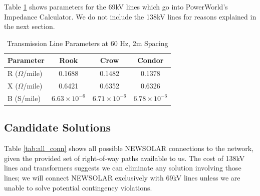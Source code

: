 \documentclass[conference]{IEEEtran}
\begin{document}
Table \ref{tab:tl_params} shows parameters for the 69kV lines which go into PowerWorld's Impedance Calculator. We do not include the 138kV lines for reasons explained in the next section.
\begin{table}
	\begin{tabular}{|l|c|c|c|}
		\hline
		Parameter & Rook & Crow & Condor \\
		\hline
		R ($\Omega$/mile) & 0.1688 & 0.1482 & 0.1378 \\
		X ($\Omega$/mile) & 0.6421 & 0.6352 & 0.6326 \\
		B (S/mile) & $6.63\times10^{-6}$ & $6.71\times10^{-6}$ & $6.78\times10^{-6}$ \\
		\hline
	\end{tabular}
	\vspace{0.5em}
	\caption{Transmission Line Parameters at 60 Hz, 2m Spacing}
	\label{tab:tl_params}
\end{table}
\subsection{Candidate Solutions}
Table \ref{tab:all_conn} shows all possible NEWSOLAR connections to the network, given the provided set of right-of-way paths available to us. The cost of 138kV lines and transformers suggests we can eliminate any solution involving those lines; we will connect NEWSOLAR exclusively with 69kV lines unless we are unable to solve potential contingency violations. 
\end{document}
